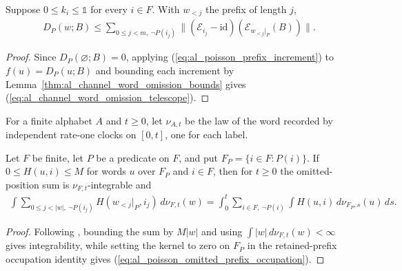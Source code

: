 \begin{lemma}
    \label{thm:al_channel_word_omission_telescope}
    \leanok
    Suppose $0\le k_i\le\mathbb 1$ for every $i\in F$. With $w_{<j}$ the prefix
    of length $j$,
    \begin{align}
        D_P(w;B)\le\sum_{0\le j<m,\ \neg P(i_j)}
        \|(\mathcal E_{i_j}-\mathrm{id})(\mathcal E_{w_{<j}|_P}(B))\|.
        \label{eq:al_channel_word_omission_telescope}
    \end{align}
\end{lemma}
\begin{proof}\leanok
    Since $D_P(\varnothing;B)=0$, applying (\ref{eq:al_poisson_prefix_increment})
    to $f(u)=D_P(u;B)$ and bounding each increment by
    Lemma~\ref{thm:al_channel_word_omission_bounds} gives
    (\ref{eq:al_channel_word_omission_telescope}).
\end{proof}

For a finite alphabet $A$ and $t\ge0$, let $\nu_{A,t}$ be the law of the
word recorded by independent rate-one clocks on $[0,t]$, one for each label.

\begin{lemma}
    \label{thm:al_poisson_omitted_prefix_occupation}
    \leanok
    Let $F$ be finite, let $P$ be a predicate on $F$, and put
    $F_P=\{i\in F:P(i)\}$. If $0\le H(u,i)\le M$ for words $u$ over $F_P$ and
    $i\in F$, then for $t\ge0$ the omitted-position sum is $\nu_{F,t}$-integrable
    and
    \begin{align}
        \int\sum_{0\le j<|w|,\ \neg P(i_j)}H(w_{<j}|_P,i_j)\,d\nu_{F,t}(w)
        =\int_0^t\sum_{i\in F,\ \neg P(i)}\int H(u,i)\,d\nu_{F_P,s}(u)\,ds.
        \label{eq:al_poisson_omitted_prefix_occupation}
    \end{align}
\end{lemma}
\begin{proof}\leanok
    Following
    \cite[``Real occupation at omitted labels'']{QICLean2026Blueprint},
    bounding the sum by $M|w|$ and using $\int|w|\,d\nu_{F,t}(w)<\infty$ gives
    integrability, while setting the kernel to zero on $F_P$ in the retained-prefix
    occupation identity gives (\ref{eq:al_poisson_omitted_prefix_occupation}).
\end{proof}

